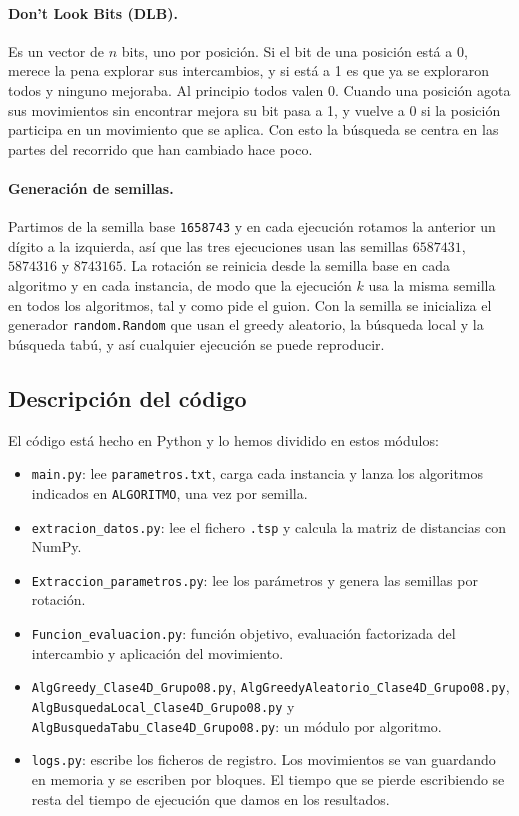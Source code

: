 \paragraph{Don't Look Bits (DLB).} Es un vector de $n$ bits, uno por posición. Si el bit de una posición está a 0, merece la pena explorar sus intercambios, y si está a 1 es que ya se exploraron todos y ninguno mejoraba. Al principio todos valen 0. Cuando una posición agota sus movimientos sin encontrar mejora su bit pasa a 1, y vuelve a 0 si la posición participa en un movimiento que se aplica. Con esto la búsqueda se centra en las partes del recorrido que han cambiado hace poco.

\paragraph{Generación de semillas.} Partimos de la semilla base \texttt{1658743} y en cada ejecución rotamos la anterior un dígito a la izquierda, así que las tres ejecuciones usan las semillas $6587431$, $5874316$ y $8743165$. La rotación se reinicia desde la semilla base en cada algoritmo y en cada instancia, de modo que la ejecución $k$ usa la misma semilla en todos los algoritmos, tal y como pide el guion. Con la semilla se inicializa el generador \texttt{random.Random} que usan el greedy aleatorio, la búsqueda local y la búsqueda tabú, y así cualquier ejecución se puede reproducir.

\subsection{Descripción del código}

El código está hecho en Python y lo hemos dividido en estos módulos:
\begin{itemize}
    \item \texttt{main.py}: lee \texttt{parametros.txt}, carga cada instancia y lanza los algoritmos indicados en \texttt{ALGORITMO}, una vez por semilla.
    \item \texttt{extracion\_datos.py}: lee el fichero \texttt{.tsp} y calcula la matriz de distancias con NumPy.
    \item \texttt{Extraccion\_parametros.py}: lee los parámetros y genera las semillas por rotación.
    \item \texttt{Funcion\_evaluacion.py}: función objetivo, evaluación factorizada del intercambio y aplicación del movimiento.
    \item \texttt{AlgGreedy\_Clase4D\_Grupo08.py}, \texttt{AlgGreedyAleatorio\_Clase4D\_Grupo08.py}, \texttt{AlgBusquedaLocal\_Clase4D\_Grupo08.py} y \texttt{AlgBusquedaTabu\_Clase4D\_Grupo08.py}: un módulo por algoritmo.
    \item \texttt{logs.py}: escribe los ficheros de registro. Los movimientos se van guardando en memoria y se escriben por bloques. El tiempo que se pierde escribiendo se resta del tiempo de ejecución que damos en los resultados.
\end{itemize}

